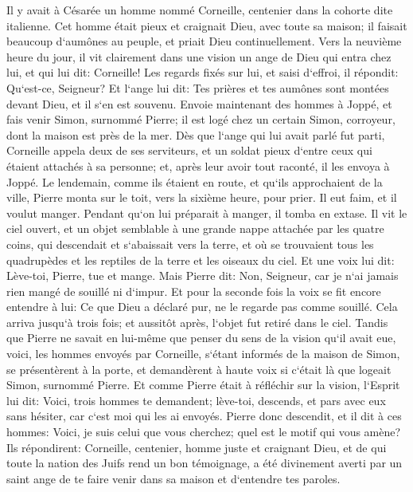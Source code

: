 \verse Il y avait à Césarée un homme nommé Corneille, centenier dans la cohorte dite italienne. 
\verse Cet homme était pieux et craignait Dieu, avec toute sa maison; il faisait beaucoup d`aumônes au peuple, et priait Dieu continuellement. 
\verse Vers la neuvième heure du jour, il vit clairement dans une vision un ange de Dieu qui entra chez lui, et qui lui dit: Corneille! 
\verse Les regards fixés sur lui, et saisi d`effroi, il répondit: Qu`est-ce, Seigneur? Et l`ange lui dit: Tes prières et tes aumônes sont montées devant Dieu, et il s`en est souvenu. 
\verse Envoie maintenant des hommes à Joppé, et fais venir Simon, surnommé Pierre; 
\verse il est logé chez un certain Simon, corroyeur, dont la maison est près de la mer. 
\verse Dès que l`ange qui lui avait parlé fut parti, Corneille appela deux de ses serviteurs, et un soldat pieux d`entre ceux qui étaient attachés à sa personne; 
\verse et, après leur avoir tout raconté, il les envoya à Joppé. 
\verse Le lendemain, comme ils étaient en route, et qu`ils approchaient de la ville, Pierre monta sur le toit, vers la sixième heure, pour prier. 
\verse Il eut faim, et il voulut manger. Pendant qu`on lui préparait à manger, il tomba en extase. 
\verse Il vit le ciel ouvert, et un objet semblable à une grande nappe attachée par les quatre coins, qui descendait et s`abaissait vers la terre, 
\verse et où se trouvaient tous les quadrupèdes et les reptiles de la terre et les oiseaux du ciel. 
\verse Et une voix lui dit: Lève-toi, Pierre, tue et mange. 
\verse Mais Pierre dit: Non, Seigneur, car je n`ai jamais rien mangé de souillé ni d`impur. 
\verse Et pour la seconde fois la voix se fit encore entendre à lui: Ce que Dieu a déclaré pur, ne le regarde pas comme souillé. 
\verse Cela arriva jusqu`à trois fois; et aussitôt après, l`objet fut retiré dans le ciel. 
\verse Tandis que Pierre ne savait en lui-même que penser du sens de la vision qu`il avait eue, voici, les hommes envoyés par Corneille, s`étant informés de la maison de Simon, se présentèrent à la porte, 
\verse et demandèrent à haute voix si c`était là que logeait Simon, surnommé Pierre. 
\verse Et comme Pierre était à réfléchir sur la vision, l`Esprit lui dit: Voici, trois hommes te demandent; 
\verse lève-toi, descends, et pars avec eux sans hésiter, car c`est moi qui les ai envoyés. 
\verse Pierre donc descendit, et il dit à ces hommes: Voici, je suis celui que vous cherchez; quel est le motif qui vous amène? 
\verse Ils répondirent: Corneille, centenier, homme juste et craignant Dieu, et de qui toute la nation des Juifs rend un bon témoignage, a été divinement averti par un saint ange de te faire venir dans sa maison et d`entendre tes paroles. 
